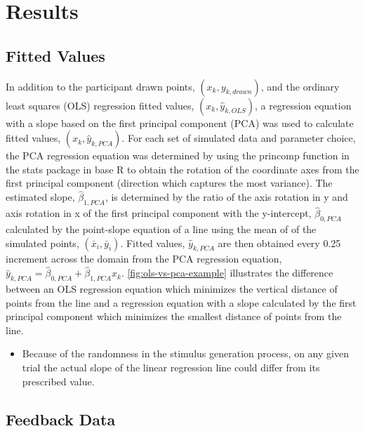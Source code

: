 \documentclass[12pt]{article}
\providecommand{\tightlist}{%
  \setlength{\itemsep}{0pt}\setlength{\parskip}{0pt}}
\begin{document}
\hypertarget{results}{%
\section{Results}\label{results}}

\hypertarget{fitted-values}{%
\subsection{Fitted Values}\label{fitted-values}}

In addition to the participant drawn points, \((x_k, y_{k,drawn})\), and
the ordinary least squares (OLS) regression fitted values,
\((x_k, \hat y_{k,OLS})\), a regression equation with a slope based on
the first principal component (PCA) was used to calculate fitted values,
\((x_k, \hat y_{k,PCA})\). For each set of simulated data and parameter
choice, the PCA regression equation was determined by using the princomp
function in the stats package in base R to obtain the rotation of the
coordinate axes from the first principal component (direction which
captures the most variance). The estimated slope, \(\hat\beta_{1,PCA}\),
is determined by the ratio of the axis rotation in y and axis rotation
in x of the first principal component with the y-intercept,
\(\hat\beta_{0,PCA}\) calculated by the point-slope equation of a line
using the mean of of the simulated points, \((\bar x_i, \bar y_i)\).
Fitted values, \(\hat y_{k,PCA}\) are then obtained every 0.25 increment
across the domain from the PCA regression equation,
\(\hat y_{k,PCA} = \hat\beta_{0,PCA} + \hat\beta_{1,PCA} x_k\).
\cref{fig:ols-vs-pca-example} illustrates the difference between an OLS
regression equation which minimizes the vertical distance of points from
the line and a regression equation with a slope calculated by the first
principal component which minimizes the smallest distance of points from
the line.

\begin{itemize}
\tightlist
\item
  Because of the randomness in the stimulus generation process, on any
  given trial the actual slope of the linear regression line could
  differ from its prescribed value.
\end{itemize}

\hypertarget{feedback-data}{%
\subsection{Feedback Data}\label{feedback-data}}
\end{document}
